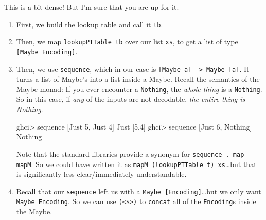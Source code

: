 \documentclass[]{article}
\newenvironment{Shaded}{}{}
\newcommand{\DataTypeTok}[1]{\textcolor[rgb]{0.56,0.13,0.00}{#1}}
\newcommand{\DecValTok}[1]{\textcolor[rgb]{0.25,0.63,0.44}{#1}}
\newcommand{\FunctionTok}[1]{\textcolor[rgb]{0.02,0.16,0.49}{#1}}
\newcommand{\NormalTok}[1]{#1}
\newcommand{\OperatorTok}[1]{\textcolor[rgb]{0.40,0.40,0.40}{#1}}
\begin{document}
This is a bit dense! But I'm sure that you are up for it.

\begin{enumerate}
\def\labelenumi{\arabic{enumi}.}
\item
  First, we build the lookup table and call it \texttt{tb}.
\item
  Then, we map \texttt{lookupPTTable\ tb} over our list \texttt{xs}, to get a
  list of type \texttt{{[}Maybe\ Encoding{]}}.
\item
  Then, we use \texttt{sequence}, which in our case is
  \texttt{{[}Maybe\ a{]}\ -\textgreater{}\ Maybe\ {[}a{]}}. It turns a list of
  Maybe's into a list inside a Maybe. Recall the semantics of the Maybe monad:
  If you ever encounter a \texttt{Nothing}, the \emph{whole thing} is a
  \texttt{Nothing}. So in this case, if \emph{any} of the inputs are not
  decodable, \emph{the entire thing is Nothing}.

\begin{Shaded}
\begin{Highlighting}[]
\NormalTok{ghci}\OperatorTok{\textgreater{}} \FunctionTok{sequence}\NormalTok{ [}\DataTypeTok{Just} \DecValTok{5}\NormalTok{, }\DataTypeTok{Just} \DecValTok{4}\NormalTok{]}
\DataTypeTok{Just}\NormalTok{ [}\DecValTok{5}\NormalTok{,}\DecValTok{4}\NormalTok{]}
\NormalTok{ghci}\OperatorTok{\textgreater{}} \FunctionTok{sequence}\NormalTok{ [}\DataTypeTok{Just} \DecValTok{6}\NormalTok{, }\DataTypeTok{Nothing}\NormalTok{]}
\DataTypeTok{Nothing}
\end{Highlighting}
\end{Shaded}

  Note that the standard libraries provide a synonym for
  \texttt{sequence\ .\ map} --- \texttt{mapM}. So we could have written it as
  \texttt{mapM\ (lookupPTTable\ t)\ xs}\ldots but that is significantly less
  clear/immediately understandable.
\item
  Recall that our \texttt{sequence} left us with a
  \texttt{Maybe\ {[}Encoding{]}}\ldots but we only want
  \texttt{Maybe\ Encoding}. So we can use \texttt{(\textless{}\$\textgreater{})}
  to \texttt{concat} all of the \texttt{Encoding}s inside the Maybe.
\end{enumerate}
\end{document}

